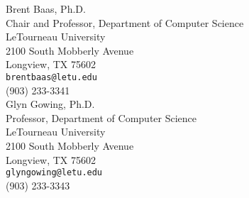 \documentclass[a4paper, 11pt]{article}
\begin{document}
    \noindent
    Brent Baas, Ph.D. \\
    Chair and Professor, Department of Computer Science \\
    LeTourneau University \\
    2100 South Mobberly Avenue \\
    Longview, TX 75602 \\
    \texttt{brentbaas@letu.edu} \\
    (903) 233-3341 \\

    \noindent
    Glyn Gowing, Ph.D. \\
    Professor, Department of Computer Science \\
    LeTourneau University \\
    2100 South Mobberly Avenue \\
    Longview, TX 75602 \\
    \texttt{glyngowing@letu.edu} \\
    (903) 233-3343 \\
    
\end{document}
